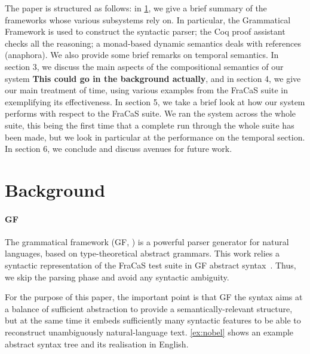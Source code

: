 \documentclass[a4paper,11pt]{article}
\begin{document}
The paper is structured as follows: in \cref{sec:background}, we give
a brief summary of the frameworks whose various subsystems rely on. In
particular, the Grammatical Framework is used to construct the
syntactic parser; the Coq proof assistant checks all the reasoning; a
monad-based dynamic semantics deals with references (anaphora).  We
also provide some brief remarks on temporal semantics. In section 3,
we discuss the main aspects of the compositional semantics of our
system \textbf{This could go in the background actually}, and in
section 4, we give our main treatment of time, using various examples
from the FraCaS suite in exemplifying its effectiveness. In section 5,
we take a brief look at how our system performs with respect to the
FraCaS suite. We ran the system across the whole suite, this being the
first time that a complete run through the whole suite has been made,
but we look in particular at the performance on the temporal
section. In section 6, we conclude and discuss avenues for future
work.



\section{Background}
\label{sec:background}

\paragraph{GF}
The grammatical framework (GF, \citet{Ranta:GF}) is a powerful parser
generator for natural languages, based on type-theoretical abstract grammars.
This work relies a syntactic representation of the FraCaS test suite in GF
abstract syntax~\citep{Ljunglof:2012}. Thus, we skip the parsing phase
and avoid any syntactic ambiguity.

For the purpose of this paper, the important point is that GF the
syntax aims at a balance of sufficient abstraction to provide a
semantically-relevant structure, but at the same time it embeds
sufficiently many syntactic features to be able to reconstruct
unambiguously natural-language text. \cref{ex:nobel}
shows an example abstract syntax tree and its realisation in English.
\end{document}
